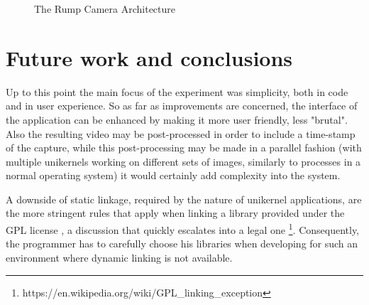 \documentclass[10pt,a4paper,twoside]{article}
\begin{document}
\begin{figure}[H]
  \centering
  \caption{The Rump Camera Architecture}
  \label{fig:archdiagram}
\end{figure}

\section{Future work and conclusions}

Up to this point the main focus of the experiment was simplicity, both in code and in user experience.
So as far as improvements are concerned, the interface of the application can be enhanced by making
it more user friendly, less "brutal". Also the resulting video may be post-processed in order to
include a time-stamp of the capture,
while this post-processing may be made in a parallel fashion (with multiple unikernels working
on different sets of images, similarly to processes in a normal operating system) it would certainly add complexity
into the system.

A downside of static linkage, required by the nature of unikernel applications, are the more
stringent rules that apply when linking a library provided under the GPL license \cite{gpl},
a discussion that quickly escalates into a legal one
\footnote{https://en.wikipedia.org/wiki/GPL\_linking\_exception}. Consequently,
the programmer has to carefully choose his libraries when developing for such an environment where
dynamic linking is not available.
\end{document}
